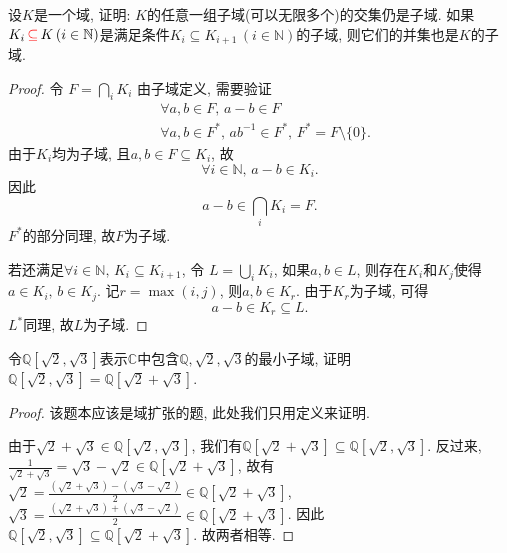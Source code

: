 \begin{problem}
    设$K$是一个域, 证明: $K$的任意一组子域(可以无限多个)的交集仍是子域. 如果$K_i \,\textcolor{red}{\subseteq}\, K \, (i \in \mathbb{N})$是满足条件$K_i \subseteq K_{i+1} \, (i \in \mathbb{N})$的子域, 则它们的并集也是$K$的子域.
\end{problem}

\begin{proof}
    令
    \(
        F = \bigcap_i K_i
    \)
    由子域定义, 需要验证
    \[
    \begin{aligned}
        &\forall a, b \in F ,\, a - b \in F\\
        &\forall a, b \in F^* ,\, ab^{-1} \in F^*,\, F^* = F \setminus \{0\}.
    \end{aligned}
    \]
    由于$K_i$均为子域, 且$a, b \in F \subseteq K_i$, 故
    \[
        \forall i \in \mathbb{N}, \, a - b \in K_i.
    \]
    因此
    \[
        a - b \in \bigcap_i K_i = F.
    \]
    $F^*$的部分同理, 故$F$为子域.
    
    若还满足$\forall i \in \mathbb{N} ,\, K_i \subseteq K_{i + 1}$, 令
    \(
        L = \bigcup_i K_i
    \),
    如果$a, b \in L$, 则存在$K_i$和$K_j$使得$a \in K_i ,\, b \in K_j$. 记$r = \max(i, j)$, 则$a, b \in K_r$. 由于$K_r$为子域, 可得
    \[
        a - b \in K_r \subseteq L.
    \]
    $L^*$同理, 故$L$为子域.
\end{proof}

\begin{problem}\label{ex:1.1.3}
    令$\mathbb{Q}[\sqrt{2}, \sqrt{3}]$表示$\mathbb{C}$中包含$\mathbb{Q}, \sqrt{2}, \sqrt{3}$的最小子域, 证明$\mathbb{Q}[\sqrt{2}, \sqrt{3}] = \mathbb{Q}[\sqrt{2} + \sqrt{3}]$.
\end{problem}

\begin{proof}
    该题本应该是域扩张的题, 此处我们只用定义来证明.

    由于$\sqrt{2} + \sqrt{3} \in \mathbb{Q}[\sqrt{2}, \sqrt{3}]$, 我们有$\mathbb{Q}[\sqrt{2} + \sqrt{3}] \subseteq \mathbb{Q}[\sqrt{2}, \sqrt{3}]$. 反过来,
    \(
        \frac{1}{\sqrt{2} + \sqrt{3}} = \sqrt{3} - \sqrt{2} \in \mathbb{Q}[\sqrt{2} + \sqrt{3}]
    \),
    故有
    \(
        \sqrt{2} = \frac{(\sqrt{2} + \sqrt{3}) - (\sqrt{3} - \sqrt{2})}{2} \in \mathbb{Q}[\sqrt{2} + \sqrt{3}]
    \),
    \(
        \sqrt{3} = \frac{(\sqrt{2} + \sqrt{3}) + (\sqrt{3} - \sqrt{2})}{2} \in \mathbb{Q}[\sqrt{2} + \sqrt{3}]
    \).
    因此
    \(
        \mathbb{Q}[\sqrt{2}, \sqrt{3}] \subseteq \mathbb{Q}[\sqrt{2} + \sqrt{3}]
    \).
    故两者相等.
\end{proof}


